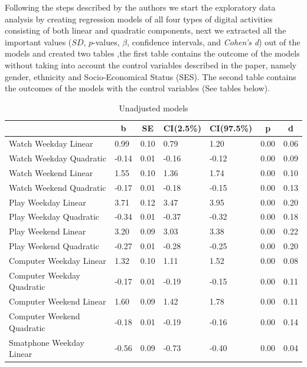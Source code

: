 \documentclass[man]{apa6}
\theoremstyle{definition}
\theoremstyle{definition}
\theoremstyle{definition}
\theoremstyle{remark}
\begin{document}
Following the steps described by the authors we start the exploratory
data analysis by creating regression models of all four types of digital
activities consisting of both linear and quadratic components, next we
extracted all the important values (\emph{\(SD\)}, \emph{\(p\)}-values,
\emph{\(\beta\)}, confidence intervals, and \emph{Cohen's d}) out of the
models and created two tables ,the first table contains the outcome of
the models without taking into account the control variables described
in the paper, namely gender, ethnicity and Socio-Economical Status
(SES). The second table contains the outcomes of the models with the
control variables (See tables below).

\begin{table}[tbp]
\begin{center}
\begin{threeparttable}
\caption{\label{tab:unnamed-chunk-1}Unadjusted models}
\begin{tabular}{lllllll}
\toprule
 & \multicolumn{1}{c}{b} & \multicolumn{1}{c}{SE} & \multicolumn{1}{c}{CI(2.5\%)} & \multicolumn{1}{c}{CI(97.5\%)} & \multicolumn{1}{c}{p} & \multicolumn{1}{c}{d}\\
\midrule
Watch Weekday Linear & 0.99 & 0.10 & 0.79 & 1.20 & 0.00 & 0.06\\
Watch Weekday Quadratic & -0.14 & 0.01 & -0.16 & -0.12 & 0.00 & 0.09\\
Watch Weekend Linear & 1.55 & 0.10 & 1.36 & 1.74 & 0.00 & 0.10\\
Watch Weekend Quadratic & -0.17 & 0.01 & -0.18 & -0.15 & 0.00 & 0.13\\
Play Weekday Linear & 3.71 & 0.12 & 3.47 & 3.95 & 0.00 & 0.20\\
Play Weekday Quadratic & -0.34 & 0.01 & -0.37 & -0.32 & 0.00 & 0.18\\
Play Weekend Linear & 3.20 & 0.09 & 3.03 & 3.38 & 0.00 & 0.22\\
Play Weekend Quadratic & -0.27 & 0.01 & -0.28 & -0.25 & 0.00 & 0.20\\
Computer Weekday Linear & 1.32 & 0.10 & 1.11 & 1.52 & 0.00 & 0.08\\
Computer Weekday Quadratic & -0.17 & 0.01 & -0.19 & -0.15 & 0.00 & 0.11\\
Computer Weekend Linear & 1.60 & 0.09 & 1.42 & 1.78 & 0.00 & 0.11\\
Computer Weekend Quadratic & -0.18 & 0.01 & -0.19 & -0.16 & 0.00 & 0.14\\
Smatphone Weekday Linear & -0.56 & 0.09 & -0.73 & -0.40 & 0.00 & 0.04\\

\end{tabular}
\end{threeparttable}
\end{center}
\end{table}
\end{document}
